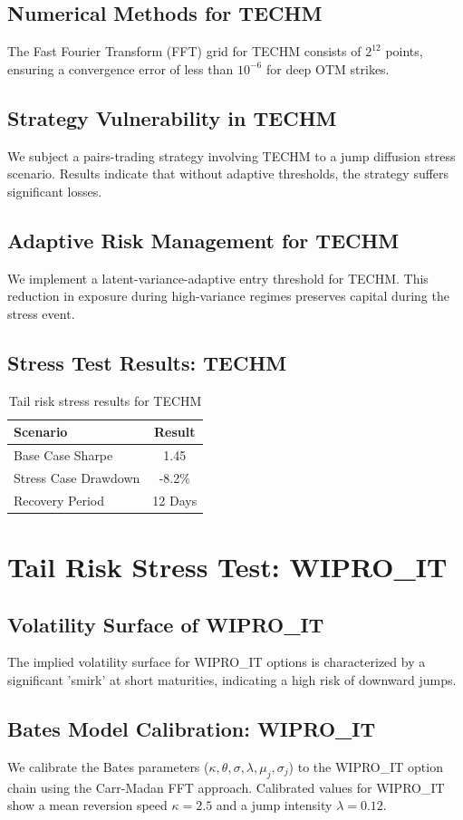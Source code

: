 \documentclass[12pt,a4paper,twoside]{article}
\begin{document}
\subsection{Numerical Methods for TECHM}
The Fast Fourier Transform (FFT) grid for TECHM consists of $2^{12}$ points, ensuring a convergence error of less than $10^{-6}$ for deep OTM strikes.
\subsection{Strategy Vulnerability in TECHM}
We subject a pairs-trading strategy involving TECHM to a jump diffusion stress scenario. Results indicate that without adaptive thresholds, the strategy suffers significant losses.
\subsection{Adaptive Risk Management for TECHM}
We implement a latent-variance-adaptive entry threshold for TECHM. This reduction in exposure during high-variance regimes preserves capital during the stress event.
\subsection{Stress Test Results: TECHM}
\begin{table}[H]
\centering
\begin{tabular}{|l|c|}
\hline
Scenario & Result \\
\hline
Base Case Sharpe & 1.45 \\
Stress Case Drawdown & -8.2\% \\
Recovery Period & 12 Days \\
\hline
\end{tabular}
\caption{Tail risk stress results for TECHM}
\end{table}
\newpage

\section{Tail Risk Stress Test: WIPRO_IT}
\subsection{Volatility Surface of WIPRO_IT}
The implied volatility surface for WIPRO_IT options is characterized by a significant 'smirk' at short maturities, indicating a high risk of downward jumps.
\subsection{Bates Model Calibration: WIPRO_IT}
We calibrate the Bates parameters ($\kappa, \theta, \sigma, \lambda, \mu_j, \sigma_j$) to the WIPRO_IT option chain using the Carr-Madan FFT approach.
Calibrated values for WIPRO_IT show a mean reversion speed $\kappa = 2.5$ and a jump intensity $\lambda = 0.12$.
\end{document}
